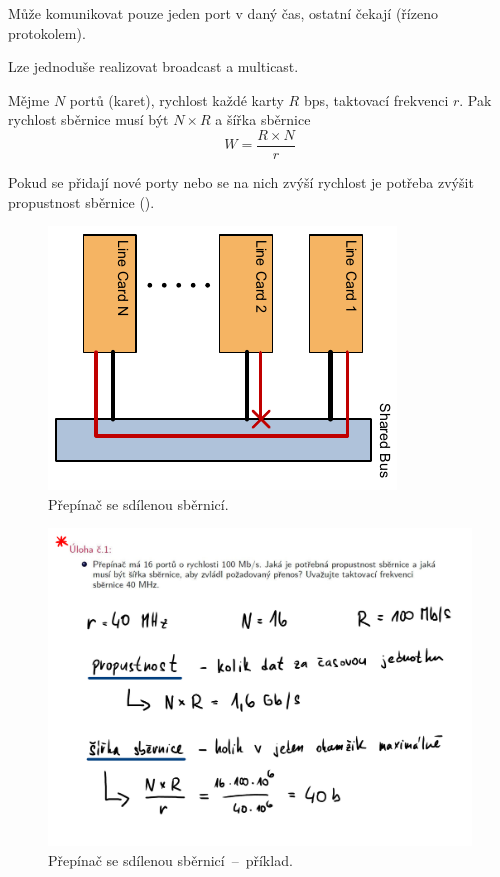 \begin{compactitem}
    \item Může komunikovat pouze jeden port v daný čas, ostatní čekají (řízeno protokolem).
    \item Lze jednoduše realizovat broadcast a multicast.
    \item Mějme $N$ portů (karet), rychlost každé karty $R$ bps, taktovací frekvenci $r$. Pak rychlost sběrnice musí být $N \times R$ a šířka sběrnice $$W = \frac{R \times N}{r}$$
    \item Pokud se přidají nové porty nebo se na nich zvýší rychlost je potřeba zvýšit propustnost sběrnice ().
\end{compactitem}

\begin{figure}[H]
    \centering
    \includegraphics[width=0.5\linewidth]{sdilena_deska_sdilena_sbernice.pdf}
    \caption{Přepínač se sdílenou sběrnicí.}
\end{figure}

\begin{figure}[H]
    \centering
    \includegraphics[width=1\linewidth]{sdilena_deska_sdilena_sbernice_priklad.pdf}
    \caption{Přepínač se sdílenou sběrnicí~--~příklad.}
\end{figure}


